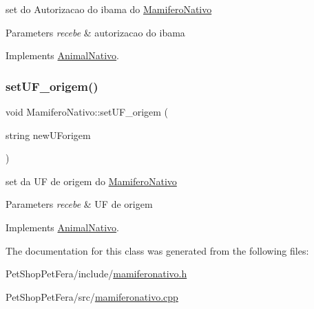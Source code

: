 set do Autorizacao do ibama do \mbox{\hyperlink{class_mamifero_nativo}{Mamifero\+Nativo}} 


\begin{DoxyParams}{Parameters}
{\em recebe} & autorizacao do ibama \\
\hline
\end{DoxyParams}


Implements \mbox{\hyperlink{class_animal_nativo_a1af7e01f35c5df788dd898136975eb49}{Animal\+Nativo}}.

\mbox{\label{class_mamifero_nativo_a33dab8f22dca500fa70ac3ed1be287c5}} 
\subsubsection{\texorpdfstring{setUF\_origem()}{setUF\_origem()}}
{\footnotesize\ttfamily void Mamifero\+Nativo\+::set\+U\+F\+\_\+origem (\begin{DoxyParamCaption}\item[{string}]{new\+U\+Forigem }\end{DoxyParamCaption})\hspace{0.3cm}{\ttfamily [virtual]}}



set da UF de origem do \mbox{\hyperlink{class_mamifero_nativo}{Mamifero\+Nativo}} 


\begin{DoxyParams}{Parameters}
{\em recebe} & UF de origem \\
\hline
\end{DoxyParams}


Implements \mbox{\hyperlink{class_animal_nativo}{Animal\+Nativo}}.



The documentation for this class was generated from the following files\+:\begin{DoxyCompactItemize}
\item 
Pet\+Shop\+Pet\+Fera/include/\mbox{\hyperlink{mamiferonativo_8h}{mamiferonativo.\+h}}\item 
Pet\+Shop\+Pet\+Fera/src/\mbox{\hyperlink{mamiferonativo_8cpp}{mamiferonativo.\+cpp}}\end{DoxyCompactItemize}
